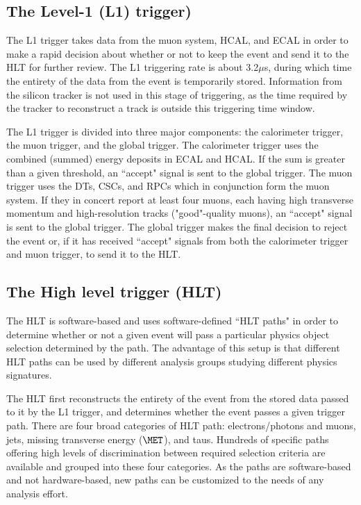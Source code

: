 \subsection{The Level-1 (L1) trigger)}

The L1 trigger takes data from the muon system, HCAL, and ECAL in order to make a rapid decision about whether or not to keep the event and send it to the HLT for further review. The L1 triggering rate is about 3.2$\mu$s, during which time the entirety of the data from the event is temporarily stored. Information from the silicon tracker is not used in this stage of triggering, as the time required by the tracker to reconstruct a track is outside this triggering time window. 

The L1 trigger is divided into three major components: the calorimeter trigger, the muon trigger, and the global trigger. The calorimeter trigger uses the combined (summed) energy deposits in ECAL and HCAL. If the sum is greater than a given threshold, an ``accept" signal is sent to the global trigger. The muon trigger uses the DTs, CSCs, and RPCs which in conjunction form the muon system. If they in concert report at least four muons, each having high transverse momentum and high-resolution tracks ("good"-quality muons), an ``accept" signal is sent to the global trigger. The global trigger makes the final decision to reject the event or, if it has received ``accept" signals from both the calorimeter trigger and muon trigger, to send it to the HLT.

\subsection{The High level trigger (HLT)}

The HLT is software-based and uses software-defined ``HLT paths" in order to determine whether or not a given event will pass a particular physics object selection determined by the path. The advantage of this setup is that different HLT paths can be used by different analysis groups studying different physics signatures.

The HLT first reconstructs the entirety of the event from the stored data passed to it by the L1 trigger, and determines whether the event passes a given trigger path. There are four broad categories of HLT path: electrons/photons and muons, jets, missing transverse energy ($\MET$), and taus. Hundreds of specific paths offering high levels of discrimination between required selection criteria are available and grouped into these four categories. As the paths are software-based and not hardware-based, new paths can be customized to the needs of any analysis effort.

